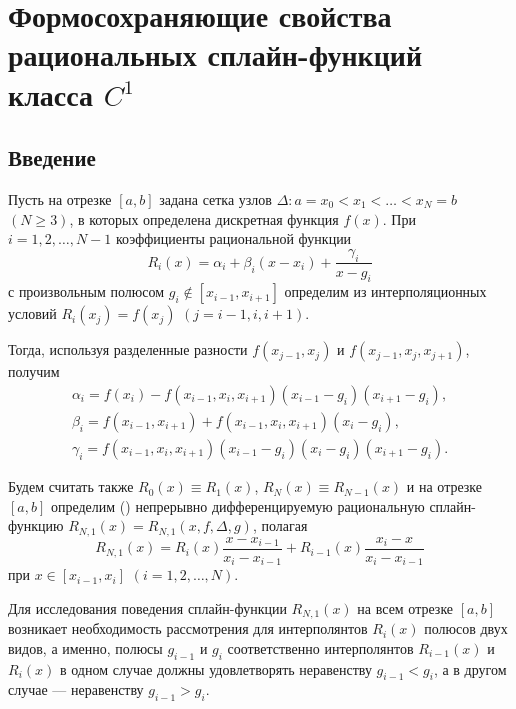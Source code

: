 
\chapter{Формосохраняющие свойства рациональных сплайн-функций класса $C^1$}%
\section{Введение}

Пусть на отрезке $[a,b]$ задана сетка узлов
$\Delta: a=x_0<x_1<\dots<x_N=b$ $(N\geqslant 3)$,
в которых определена дискретная функция $f(x)$. При $i=1,2,\dots,N-1$ коэффициенты
рациональной функции
\begin{equation}\label{ark-1.1}
R_i(x)=\alpha_i+\beta_i (x-x_i)+\frac{\gamma_i}{x-g_i}
\end{equation}
с произвольным полюсом $g_i\not \in [x_{i-1},x_{i+1}]$ определим из интерполяционных условий
$R_i(x_j)=f(x_j)$ $(j=i-1,i,i+1)$.

Тогда, используя разделенные разности $f(x_{j-1}, x_j)$ и $f(x_{j-1}, x_j, x_{j+1})$, получим
\begin{equation}
\begin{array}{l}
\alpha_i=f(x_i)-f(x_{i-1}, x_i, x_{i+1})(x_{i-1}-g_i)(x_{i+1}-g_i),\\
\beta_i=f(x_{i-1}, x_{i+1})+f(x_{i-1}, x_i, x_{i+1})(x_i-g_i),\\
\gamma_i=f(x_{i-1}, x_i, x_{i+1})(x_{i-1}-g_i)(x_i-g_i)(x_{i+1}-g_i).
\end{array}\label{ark-1.2}
\end{equation}

Будем считать также $R_0(x)\equiv R_1(x)$, $R_N(x)\equiv R_{N-1}(x)$ и на отрезке $[a,b]$
определим (\cite{ark-12}) непрерывно дифференцируемую рациональную сплайн-функцию
$R_{N,1}(x)=R_{N,1} (x, f, \Delta, g)$, полагая
\begin{equation}\label{ark-1.3}
R_{N,1}(x)=R_i(x)\frac{x-x_{i-1}}{x_i-x_{i-1}}+R_{i-1} (x)\frac{x_i-x}{x_i-x_{i-1}}
\end{equation}
при $x\in[x_{i-1},x_i]$ $(i=1,2,\dots,N)$.

Для исследования поведения сплайн-функции $R_{N,1}(x)$  на всем отрезке $[a,b]$ возникает
необходимость рассмотрения  для интерполянтов $R_i(x)$ полюсов  двух видов, а именно,
полюсы $g_{i-1}$ и $g_i$ соответственно интерполянтов
$R_{i-1} (x)$ и $R_i(x)$ в одном случае должны удовлетворять неравенству $g_{i-1}<g_i$,
 а в другом случае --- неравенству $g_{i-1}>g_i$.

